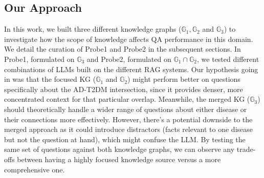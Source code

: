 \subsection{Our Approach}
In this work, we built three different knowledge graphs ($\mathbb{G}_1, \mathbb{G}_2$ and $\mathbb{G}_3$) to investigate how the scope of knowledge affects QA performance in this domain. We detail the curation of Probe1 and Probe2 in the subsequent sections. 
In Probe1, formulated on $\mathbb{G}_3$ and Probe2, formulated on $\mathbb{G}_1 \cap \mathbb{G}_2$, we tested different combinations of LLMs built on the different RAG systems.
Our hypothesis going in was that the focused KG ($\mathbb{G}_1$ and $\mathbb{G}_2$) might perform better on questions specifically about the AD-T2DM intersection, since it provides denser, more concentrated context for that particular overlap. Meanwhile, the merged KG ($\mathbb{G}_3$) should theoretically handle a wider range of questions about either disease or their connections more effectively. However, there's a potential downside to the merged approach as it could introduce distractors (facts relevant to one disease but not the question at hand), which might confuse the LLM. By testing the same set of questions against both knowledge graphs, we can observe any trade-offs between having a highly focused knowledge source versus a more comprehensive one.





